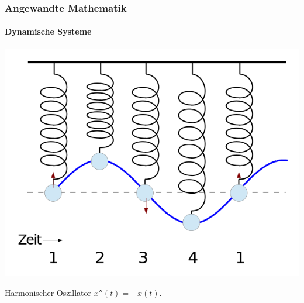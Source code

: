 \documentclass{beamer}
\begin{document}
\begin{frame}
    \frametitle{Angewandte Mathematik}
\framesubtitle{Dynamische Systeme }
\includegraphics[scale=0.35]{images/federpendel}

\begin{block}{Harmonischer Oszillator}
$x''(t) = -x(t)$.
\end{block}

 \end{frame}
\end{document}
